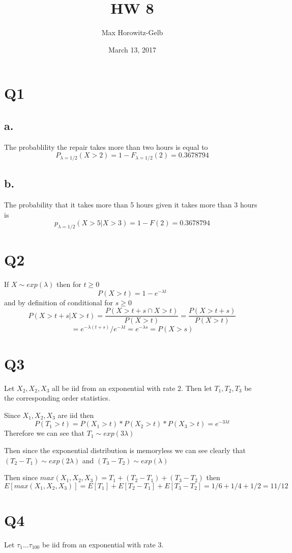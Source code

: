 \documentclass{article}
\title{HW 8}
\author{Max Horowitz-Gelb}
\date{March 13, 2017}
\begin{document}
\maketitle

\section*{Q1}
\subsection*{a.}
The probablility the repair takes more than two hours is equal to 
\[
P_{\lambda = 1/2}(X > 2) = 1 - F_{\lambda = 1/2}(2) = 0.3678794
\]


\subsection*{b.}
The probability that it takes more than 5 hours given it takes more than 3 hours is
\[
p_{\lambda = 1/2}(X >5 | X>3) = 1 - F(2) = 0.3678794
\]

\section*{Q2}
If $X \sim exp(\lambda)$ then 
for $t \geq 0$
\[
P(X > t) = 1 - e^{-\lambda t}
\]
and by definition of conditional for $s \geq 0$
\[
P(X > t +s | X > t) = \frac{P(X > t+s \cap X > t)}{P(X > t)} = \frac{P(X > t+s)}{P(X > t)}
\]
\[
= e^{-\lambda(t+s)} / e^{-\lambda t} = e^{-\lambda s} = P(X > s)
\]

\section*{Q3}
Let $X_2, X_2, X_3$ all be iid from an exponential with rate 2. 
Then let $T_1, T_2, T_3$ be the corresponding order statistics. 

Since $X_1, X_2, X_3$ are iid then
\[
P(T_1 > t) = P(X_1 > t)*P(X_2 >t)*P(X_3 >t) = e^{-3\lambda t}
\]
Therefore we can see that $T_1 \sim exp(3\lambda)$

Then since the exponential distribution is memoryless we can see clearly that $(T_2 - T_1) \sim exp(2 \lambda)$ and $(T_3 - T_2) \sim exp(\lambda)$

Then since $max(X_1, X_2, X_3) = T_1 + (T_2 - T_1) + (T_3 - T_2)$
then
\[
E[max(X_1, X_2, X_3)] = E[T_1] + E[T_2 - T_1] + E[T_3-T_2] = 1/6 + 1/4 + 1/2 = 11/12
\]

\section*{Q4}
Let $\tau_1 ... \tau_{100}$ be iid from an exponential with rate 3.
\end{document}
